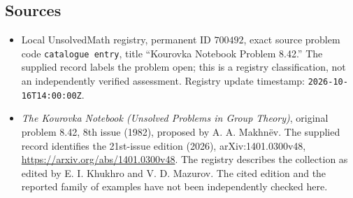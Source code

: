 \documentclass[11pt]{article}
\begin{document}
\subsection{Sources}
\begin{itemize}
\item Local UnsolvedMath registry, permanent ID \(700492\), exact source problem code \texttt{catalogue entry}, title ``Kourovka Notebook Problem 8.42.'' The supplied record labels the problem open; this is a registry classification, not an independently verified assessment. Registry update timestamp: \texttt{2026-10-16T14:00:00Z}.
\item \emph{The Kourovka Notebook (Unsolved Problems in Group Theory)}, original problem 8.42, 8th issue (1982), proposed by A. A. Makhn\"{e}v. The supplied record identifies the 21st-issue edition (2026), arXiv:1401.0300v48, \url{https://arxiv.org/abs/1401.0300v48}. The registry describes the collection as edited by E. I. Khukhro and V. D. Mazurov. The cited edition and the reported family of examples have not been independently checked here.
\end{itemize}
\end{document}
